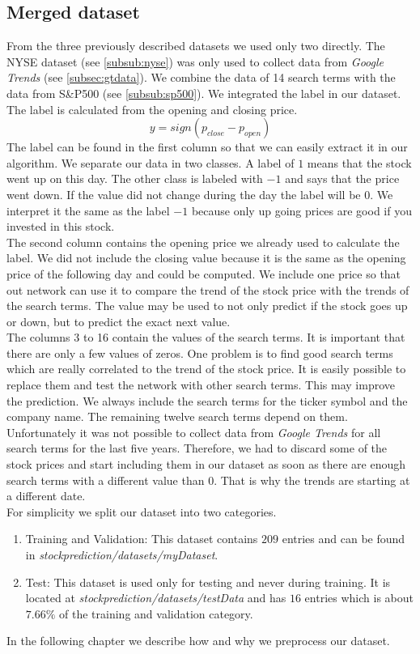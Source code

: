 \subsection{Merged dataset}
\label{subsec:merged}
From the three previously described datasets we used only two directly. The NYSE dataset (see \ref{subsub:nyse}) was only used to collect data from \textit{Google Trends} (see \ref{subsec:gtdata}). We combine the data of 14 search terms with the data from S\&P500 (see \ref{subsub:sp500}). We integrated the label in our dataset. The label is calculated from the opening and closing price.
\begin{equation}
y = sign(p_{close} - p_{open})
\end{equation}
The label can be found in the first column so that we can easily extract it in our algorithm. We separate our data in two classes. A label of $1$ means that the stock went up on this day. The other class is labeled with $-1$ and says that the price went down. If the value did not change during the day the label will be $0$. We interpret it the same as the label $-1$ because only up going prices are good if you invested in this stock.\\
The second column contains the opening price we already used to calculate the label. We did not include the closing value because it is the same as the opening price of the following day and could be computed. We include one price so that out network can use it to compare the trend of the stock price with the trends of the search terms. The value may be used to not only predict if the stock goes up or down, but to predict the exact next value.\\
The columns 3 to 16 contain the values of the search terms. It is important that there are only a few values of zeros. One problem is to find good search terms which are really correlated to the trend of the stock price. It is easily possible to replace them and test the network with other search terms. This may improve the prediction. We always include the search terms for the ticker symbol and the company name. The remaining twelve search terms depend on them.\\
Unfortunately it was not possible to collect data from \textit{Google Trends} for all search terms for the last five years. Therefore, we had to discard some of the stock prices and start including them in our dataset as soon as there are enough search terms with a different value than $0$. That is why the trends are starting at a different date.\\
For simplicity we split our dataset into two categories.
\begin{enumerate}
	\item Training and Validation: This dataset contains $209$ entries and can be found in \mbox{\textit{stockprediction/datasets/myDataset}}.
	\item Test: This dataset is used only for testing and never during training. It is located at \mbox{\textit{stockprediction/datasets/testData}} and has $16$ entries which is about $7.66\%$ of the training and validation category.
\end{enumerate}
In the following chapter we describe how and why we preprocess our dataset.
